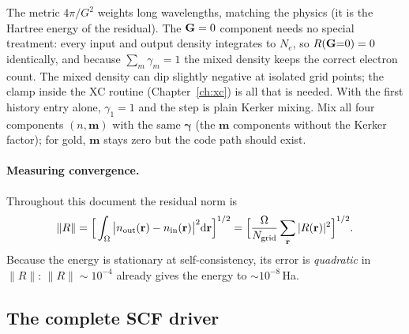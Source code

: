 The metric $4\pi/G^2$ weights long wavelengths, matching the physics (it
is the Hartree energy of the residual). The $\mathbf{G}=0$ component needs no
special treatment: every input and output density integrates to $N_e$, so
$R(\mathbf{G}{=}0)=0$ identically, and because $\sum_m\gamma_m = 1$ the mixed
density keeps the correct electron count. The mixed density can dip
slightly negative at isolated grid points; the clamp inside the XC routine
(Chapter~\ref{ch:xc}) is all that is needed. With the first history entry
alone, $\gamma_1 = 1$ and the step is plain Kerker mixing. Mix all four
components $(n, \mathbf m)$ with the same $\bm\gamma$ (the $\mathbf m$
components without the Kerker factor); for gold, $\mathbf m$ stays zero but
the code path should exist.

\paragraph{Measuring convergence.} Throughout this document the residual
norm is
\begin{equation}
\|R\| = \Big[\int_\Omega \big|n_{\mathrm{out}}(\mathbf{r})-n_{\mathrm{in}}(\mathbf{r})\big|^2
\mathrm{d}\mathbf{r}\Big]^{1/2}
= \Big[\frac{\Omega}{N_{\mathrm{grid}}}\sum_{\mathbf{r}}|R(\mathbf{r})|^2\Big]^{1/2}.
\label{eq:resnorm}
\end{equation}
Because the energy is stationary at self-consistency, its error is
\emph{quadratic} in $\|R\|$: $\|R\|\sim10^{-4}$ already gives the energy to
$\sim10^{-8}$\,Ha.

\subsection{The complete SCF driver}

